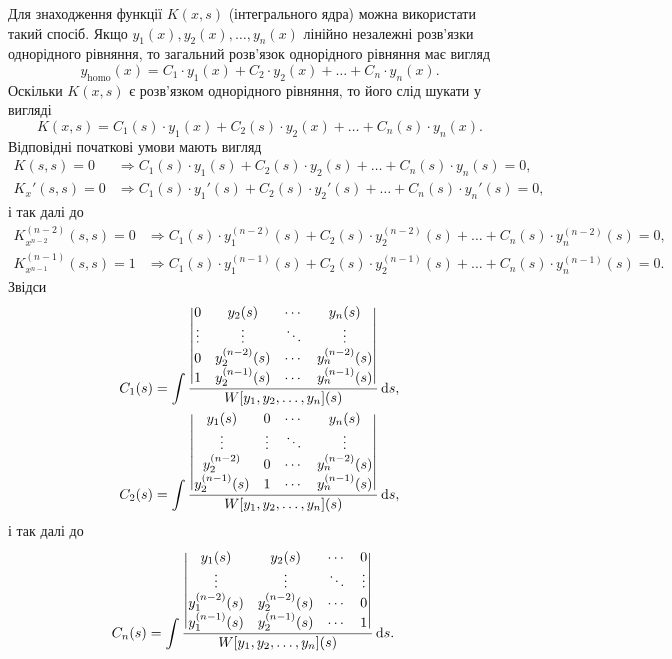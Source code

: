 Для знаходження функції $K(x, s)$ (інтегрального ядра) можна використати такий спосіб. Якщо $y_1(x), y_2(x), \ldots, y_n(x)$ лінійно незалежні розв’язки однорідного рівняння, то загальний розв’язок однорідного рівняння має вигляд 
\begin{equation*}
	y_{\text{homo}}(x) = C_1 \cdot y_1(x) + C_2 \cdot y_2(x) + \ldots + C_n \cdot y_n(x).
\end{equation*}
Оскільки $K(x, s)$ є розв’язком однорідного рівняння, то його слід шукати у вигляді
\begin{equation*}
	K(x, s) = C_1(s) \cdot y_1(x) + C_2(s) \cdot y_2(x) + \ldots + C_n(s) \cdot y_n(x).
\end{equation*}
Відповідні початкові умови мають вигляд
\begin{align*}
	K(s, s) = 0 &\Rightarrow C_1(s) \cdot y_1(s) + C_2(s) \cdot y_2(s) + \ldots + C_n(s) \cdot y_n(s) = 0, \\
	K_x'(s, s) = 0 &\Rightarrow C_1(s) \cdot y_1'(s) + C_2(s) \cdot y_2'(s) + \ldots + C_n(s) \cdot y_n'(s) = 0,
\end{align*}
і так далі до
\begin{align*}
	K_{x^{n - 2}}^{(n - 2)}(s, s) = 0 &\Rightarrow C_1(s) \cdot y_1^{(n - 2)}(s) + C_2(s) \cdot y_2^{(n - 2)}(s) + \ldots + C_n(s) \cdot y_n^{(n - 2)}(s) = 0, \\
	K_{x^{n - 1}}^{(n - 1)}(s, s) = 1 &\Rightarrow C_1(s) \cdot y_1^{(n - 1)}(s) + C_2(s) \cdot y_2^{(n - 1)}(s) + \ldots + C_n(s) \cdot y_n^{(n - 1)}(s) = 0. 
\end{align*}
Звідси
\begin{align*}
	C_1(s) &= \int \frac{\begin{vmatrix} 0 & y_2(s) & \cdots & y_n(s) \\ \vdots & \vdots & \ddots & \vdots \\ 0 & y_2^{(n - 2)}(s) & \cdots & y_n^{(n - 2)}(s) \\ 1 & y_2^{(n - 1)}(s) & \cdots & y_n^{(n - 1)}(s) \end{vmatrix}}{W[y_1, y_2, \ldots, y_n](s)} \mathop{}\!\mathrm{d} s, \\
	C_2(s) &= \int \frac{\begin{vmatrix} y_1(s) & 0 & \cdots & y_n(s) \\ \vdots & \vdots & \ddots & \vdots \\ y_2^{(n - 2)} & 0 & \cdots & y_n^{(n - 2)}(s) \\ y_2^{(n - 1)}(s) & 1 & \cdots & y_n^{(n - 1)}(s) \end{vmatrix}}{W[y_1, y_2, \ldots, y_n](s)} \mathop{}\!\mathrm{d} s,
\end{align*}
і так далі до
\begin{align*}
	C_n(s) &= \int \frac{\begin{vmatrix} y_1(s) & y_2(s) & \cdots & 0 \\ \vdots & \vdots & \ddots & \vdots \\ y_1^{(n - 2)}(s) & y_2^{(n - 2)}(s) & \cdots & 0 \\ y_1^{(n - 1)}(s) & y_2^{(n - 1)}(s) & \cdots & 1 \end{vmatrix}}{W[y_1, y_2, \ldots, y_n](s)} \mathop{}\!\mathrm{d} s.
\end{align*}
 

